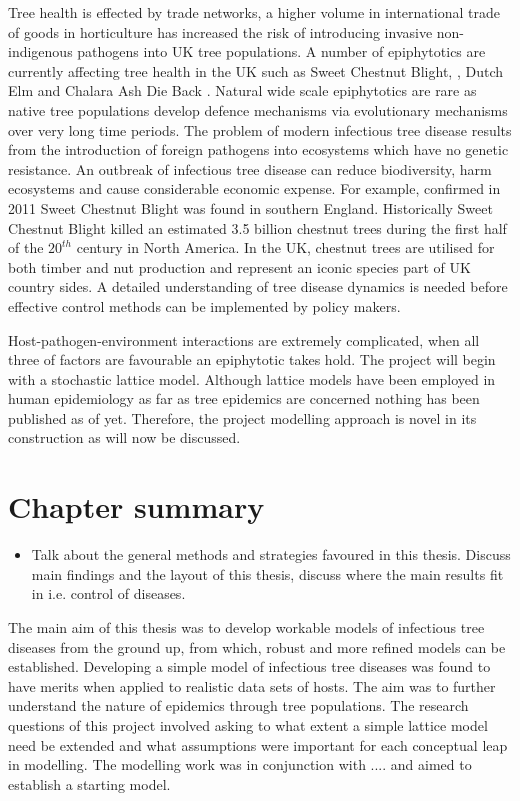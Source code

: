 Tree health is effected by trade networks, a higher volume in international trade of goods in horticulture has increased the risk of introducing invasive non-indigenous pathogens into UK tree populations. A number of epiphytotics are currently affecting tree health in the UK such as Sweet Chestnut Blight, \cite{MITCHELL201495, CB}, Dutch Elm \cite{DUTCH_ELM1,DUTCH_ELM2} and Chalara Ash Die Back \cite{ADB}. Natural wide scale epiphytotics are rare as native tree populations develop defence mechanisms via evolutionary mechanisms over very long time periods. The problem of modern infectious tree disease results from the introduction of foreign pathogens into ecosystems which have no genetic resistance. An outbreak of infectious tree disease can reduce biodiversity, harm ecosystems and cause considerable economic expense. For example, confirmed in 2011 Sweet Chestnut Blight was found in southern England. Historically Sweet Chestnut Blight killed an estimated 3.5 billion chestnut trees during the first half of the $20^{th}$ century in North America. In the UK, chestnut trees are utilised for both timber and nut production and represent an iconic species part of UK country sides. A detailed understanding of tree disease dynamics is needed before effective control methods can be implemented by policy makers.

Host-pathogen-environment interactions are extremely complicated, when all three of factors are favourable an epiphytotic takes hold. The project will begin with a stochastic lattice model. Although lattice models have been employed in human epidemiology as far as tree epidemics are concerned nothing has  been published as of yet. Therefore, the project modelling approach is novel in its construction as will now be discussed.


\section{Chapter summary}

\begin{itemize}
    \item Talk about the general methods and strategies favoured in this thesis. Discuss main findings and the layout of this thesis, discuss where the main results fit in i.e. control of diseases.
\end{itemize}

The main aim of this thesis was to develop workable models of infectious tree diseases from the ground up, from which, robust and more refined models can be established. Developing a simple model of infectious tree diseases was found to have merits when applied to realistic data sets of hosts. The aim was to further understand the nature of epidemics through tree populations. The research questions of this project involved asking to what extent a simple lattice model need be extended and what assumptions were important for each conceptual leap in modelling. The modelling work was in conjunction with .... and aimed to establish a starting model.

